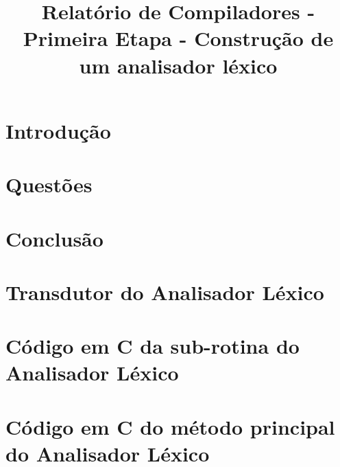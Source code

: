 \documentclass[12pt,oneside,a4paper,english]{abntex2}
\title{Relatório de Compiladores - Primeira Etapa - Construção de um analisador léxico}
\begin{document}
\frenchspacing %

\imprimircapa
\imprimirfolhaderosto

\clearpage
\begin{resumo}
	
\end{resumo}

\tableofcontents

\textual

\chapter{Introdução}
\label{chap:introducao}
	

\chapter{Questões}
\label{chap:questoes}
	

\chapter{Conclusão}
\label{chap:conclusao}
	



\begin{apendicesenv} %

\partapendices

\chapter{Transdutor do Analisador Léxico}
\label{app:transdutor}


\chapter{Código em C da sub-rotina do Analisador Léxico}
\label{app:codigo}


\chapter{Código em C do método principal do Analisador Léxico}
\label{app:codigo}


\end{apendicesenv}
\end{document}
